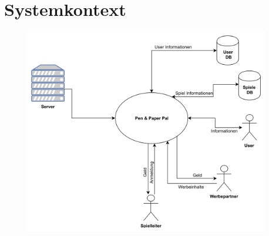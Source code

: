 \documentclass[DIV=13, 10pt,a4paper]{scrartcl}
\begin{document}
\section{Systemkontext}
\begin{figure}[h!]
	\centering
	\includegraphics[width = 0.95\textwidth]{docs/0_Sonstiges/03_03_Systemkontext.jpg}
	\label{fig:SystemKontext}
 \end{figure}
\end{document}

